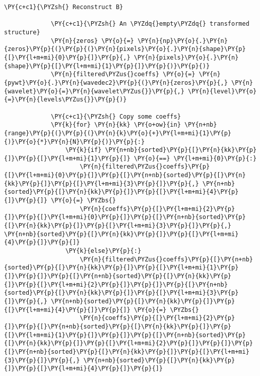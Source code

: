 \begin{Verbatim}[commandchars=\\\{\}]
             \PY{c+c1}{\PYZsh{} Reconstruct B}
         
             \PY{c+c1}{\PYZsh{} An \PYZdq{}empty\PYZdq{} transformed structure}
             \PY{n}{zeros} \PY{o}{=} \PY{n}{np}\PY{o}{.}\PY{n}{zeros}\PY{p}{(}\PY{p}{(}\PY{n}{pixels}\PY{o}{.}\PY{n}{shape}\PY{p}{[}\PY{l+m+mi}{0}\PY{p}{]}\PY{p}{,} \PY{n}{pixels}\PY{o}{.}\PY{n}{shape}\PY{p}{[}\PY{l+m+mi}{1}\PY{p}{]}\PY{p}{)}\PY{p}{)}
             \PY{n}{filtered\PYZus{}coeffs} \PY{o}{=} \PY{n}{pywt}\PY{o}{.}\PY{n}{wavedec2}\PY{p}{(}\PY{n}{zeros}\PY{p}{,} \PY{n}{wavelet}\PY{o}{=}\PY{n}{wavelet\PYZus{}}\PY{p}{,} \PY{n}{level}\PY{o}{=}\PY{n}{levels\PYZus{}}\PY{p}{)}
         
             \PY{c+c1}{\PYZsh{} Copy some coeffs}
             \PY{k}{for} \PY{n}{kk} \PY{o+ow}{in} \PY{n+nb}{range}\PY{p}{(}\PY{p}{(}\PY{n}{k}\PY{o}{+}\PY{l+m+mi}{1}\PY{p}{)}\PY{o}{*}\PY{n}{N}\PY{p}{)}\PY{p}{:}
                 \PY{k}{if} \PY{n+nb}{sorted}\PY{p}{[}\PY{n}{kk}\PY{p}{]}\PY{p}{[}\PY{l+m+mi}{1}\PY{p}{]} \PY{o}{==} \PY{l+m+mi}{0}\PY{p}{:}
                     \PY{n}{filtered\PYZus{}coeffs}\PY{p}{[}\PY{l+m+mi}{0}\PY{p}{]}\PY{p}{[}\PY{n+nb}{sorted}\PY{p}{[}\PY{n}{kk}\PY{p}{]}\PY{p}{[}\PY{l+m+mi}{3}\PY{p}{]}\PY{p}{,} \PY{n+nb}{sorted}\PY{p}{[}\PY{n}{kk}\PY{p}{]}\PY{p}{[}\PY{l+m+mi}{4}\PY{p}{]}\PY{p}{]} \PY{o}{=} \PYZbs{}
                     \PY{n}{coeffs}\PY{p}{[}\PY{l+m+mi}{2}\PY{p}{]}\PY{p}{[}\PY{l+m+mi}{0}\PY{p}{]}\PY{p}{[}\PY{n+nb}{sorted}\PY{p}{[}\PY{n}{kk}\PY{p}{]}\PY{p}{[}\PY{l+m+mi}{3}\PY{p}{]}\PY{p}{,} \PY{n+nb}{sorted}\PY{p}{[}\PY{n}{kk}\PY{p}{]}\PY{p}{[}\PY{l+m+mi}{4}\PY{p}{]}\PY{p}{]}
                 \PY{k}{else}\PY{p}{:}
                     \PY{n}{filtered\PYZus{}coeffs}\PY{p}{[}\PY{n+nb}{sorted}\PY{p}{[}\PY{n}{kk}\PY{p}{]}\PY{p}{[}\PY{l+m+mi}{1}\PY{p}{]}\PY{p}{]}\PY{p}{[}\PY{n+nb}{sorted}\PY{p}{[}\PY{n}{kk}\PY{p}{]}\PY{p}{[}\PY{l+m+mi}{2}\PY{p}{]}\PY{p}{]}\PY{p}{[}\PY{n+nb}{sorted}\PY{p}{[}\PY{n}{kk}\PY{p}{]}\PY{p}{[}\PY{l+m+mi}{3}\PY{p}{]}\PY{p}{,} \PY{n+nb}{sorted}\PY{p}{[}\PY{n}{kk}\PY{p}{]}\PY{p}{[}\PY{l+m+mi}{4}\PY{p}{]}\PY{p}{]} \PY{o}{=} \PYZbs{}
                     \PY{n}{coeffs}\PY{p}{[}\PY{l+m+mi}{2}\PY{p}{]}\PY{p}{[}\PY{n+nb}{sorted}\PY{p}{[}\PY{n}{kk}\PY{p}{]}\PY{p}{[}\PY{l+m+mi}{1}\PY{p}{]}\PY{p}{]}\PY{p}{[}\PY{n+nb}{sorted}\PY{p}{[}\PY{n}{kk}\PY{p}{]}\PY{p}{[}\PY{l+m+mi}{2}\PY{p}{]}\PY{p}{]}\PY{p}{[}\PY{n+nb}{sorted}\PY{p}{[}\PY{n}{kk}\PY{p}{]}\PY{p}{[}\PY{l+m+mi}{3}\PY{p}{]}\PY{p}{,} \PY{n+nb}{sorted}\PY{p}{[}\PY{n}{kk}\PY{p}{]}\PY{p}{[}\PY{l+m+mi}{4}\PY{p}{]}\PY{p}{]}
         

\end{Verbatim}
